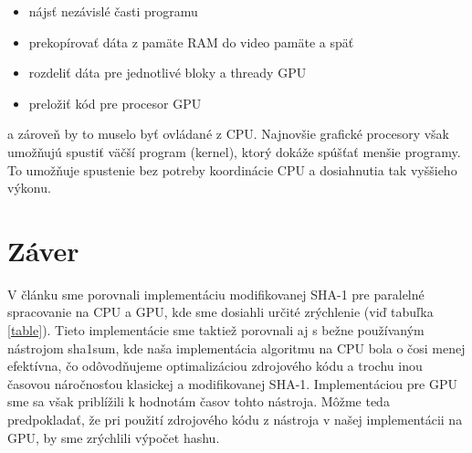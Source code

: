 \documentclass[conference]{IEEEtran}
\begin{document}
\begin{itemize}
	\item{nájsť nezávislé časti programu}
	\item{prekopírovať dáta z pamäte RAM do video pamäte a späť}
	\item{rozdeliť dáta pre jednotlivé bloky a thready GPU}
	\item{preložiť kód pre procesor GPU}
\end{itemize}

a zároveň by to muselo byť ovládané z CPU. Najnovšie grafické procesory však umožňujú spustiť väčší program (kernel), ktorý dokáže spúšťať menšie programy. To umožňuje spustenie bez potreby koordinácie CPU \cite{tatourian} a dosiahnutia tak vyššieho výkonu.

\section{Záver}
V článku sme porovnali implementáciu modifikovanej SHA-1 pre paralelné spracovanie na CPU a GPU, kde sme dosiahli určité zrýchlenie (viď tabuľka \ref{table}). Tieto implementácie sme taktiež porovnali aj s bežne používaným nástrojom sha1sum, kde naša implementácia algoritmu na CPU bola o čosi menej efektívna, čo odôvodňujeme optimalizáciou zdrojového kódu a trochu inou časovou náročnosťou klasickej a modifikovanej SHA-1. Implementáciou pre GPU sme sa však priblížili k hodnotám časov tohto nástroja. Môžme teda predpokladať, že pri použití zdrojového kódu z nástroja v našej implementácii na GPU, by sme zrýchlili výpočet hashu. 
\end{document}
